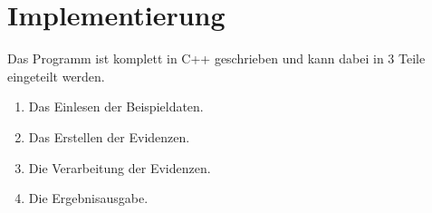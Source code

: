 \chapter{Implementierung}
Das Programm ist komplett in C++ geschrieben und kann dabei in 3 Teile eingeteilt werden.

\begin{enumerate}
  \item Das Einlesen der Beispieldaten. 
  \item Das Erstellen der Evidenzen.
  \item Die Verarbeitung der Evidenzen.
  \item Die Ergebnisausgabe.
\end{enumerate}
 